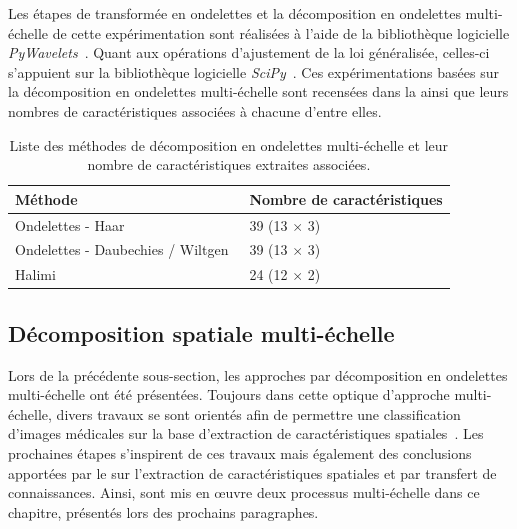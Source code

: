 Les étapes de transformée en ondelettes et la décomposition en ondelettes multi-échelle de cette expérimentation sont réalisées à l'aide de la bibliothèque logicielle \textit{PyWavelets}~\cite{lee2006}. Quant aux opérations d'ajustement de la loi généralisée, celles-ci s'appuient sur la bibliothèque logicielle \textit{SciPy}~\cite{Virtanen2020}. Ces expérimentations basées sur la décomposition en ondelettes multi-échelle sont recensées dans la  ainsi que leurs nombres de caractéristiques associées à chacune d'entre elles.\par

\begin{table}[h]
    \centering
    \begin{tabular}{ll}
        \toprule
        \textbf{Méthode}                                    & \textbf{Nombre de caractéristiques}   \\ \hline
        Ondelettes - Haar                                   & 39 (13 $\times$ 3)                    \\ \hline
        Ondelettes - Daubechies / Wiltgen~\cite{Wiltgen2008}& 39 (13 $\times$ 3)                    \\ \hline
        Halimi~\cite{Halimi2017a}                           & 24 (12 $\times$ 2)                    \\
        \bottomrule
    \end{tabular}
    \caption{Liste des méthodes de décomposition en ondelettes multi-échelle et leur nombre de caractéristiques extraites associées.}
    \label{tab:wavelet_image_improvement_multiscale_nb_features}
\end{table}\par
\clearpage

\subsection{Décomposition spatiale multi-échelle}
Lors de la précédente sous-section, les approches par décomposition en ondelettes multi-échelle ont été présentées. Toujours dans cette optique d'approche multi-échelle, divers travaux se sont orientés afin de permettre une classification d'images médicales sur la base d'extraction de caractéristiques spatiales~\cite{Alsaih2016,Tzalavra2016}. Les prochaines étapes s'inspirent de ces travaux mais également des conclusions apportées par le  sur l'extraction de caractéristiques spatiales et par transfert de connaissances. Ainsi, sont mis en œuvre deux processus multi-échelle dans ce chapitre, présentés lors des prochains paragraphes.\par

